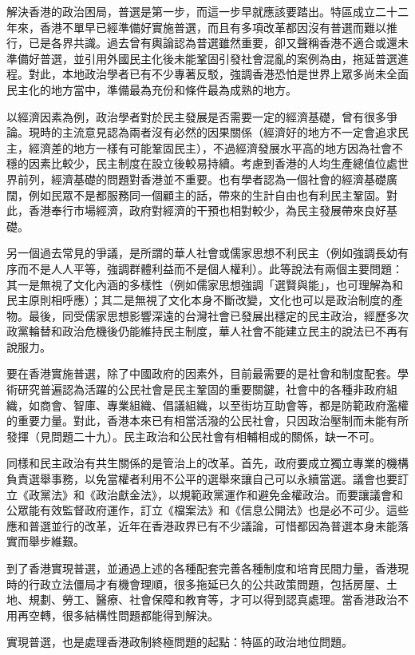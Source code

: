 解決香港的政治困局，普選是第一步，而這一步早就應該要踏出。特區成立二十二年來，香港不單早已經準備好實施普選，而且有多項改革都因沒有普選而難以推行，已是各界共識。過去曾有輿論認為普選雖然重要，卻又聲稱香港不適合或還未準備好普選，並引用外國民主化後未能鞏固引發社會混亂的案例為由，拖延普選進程。對此，本地政治學者已有不少專著反駁，強調香港恐怕是世界上眾多尚未全面民主化的地方當中，準備最為充份和條件最為成熟的地方。

以經濟因素為例，政治學者對於民主發展是否需要一定的經濟基礎，曾有很多爭論。現時的主流意見認為兩者沒有必然的因果關係（經濟好的地方不一定會追求民主，經濟差的地方一樣有可能鞏固民主），不過經濟發展水平高的地方因為社會不穩的因素比較少，民主制度在設立後較易持續。考慮到香港的人均生產總值位處世界前列，經濟基礎的問題對香港並不重要。也有學者認為一個社會的經濟基礎廣闊，例如民眾不是都服務同一個顧主的話，帶來的生計自由也有利民主鞏固。對此，香港奉行市場經濟，政府對經濟的干預也相對較少，為民主發展帶來良好基礎。

另一個過去常見的爭議，是所謂的華人社會或儒家思想不利民主（例如強調長幼有序而不是人人平等，強調群體利益而不是個人權利）。此等說法有兩個主要問題：其一是無視了文化內涵的多樣性（例如儒家思想強調「選賢與能」，也可理解為和民主原則相呼應）；其二是無視了文化本身不斷改變，文化也可以是政治制度的產物。最後，同受儒家思想影響深遠的台灣社會已發展出穩定的民主政治，經歷多次政黨輪替和政治危機後仍能維持民主制度，華人社會不能建立民主的說法已不再有說服力。

要在香港實施普選，除了中國政府的因素外，目前最需要的是社會和制度配套。學術研究普遍認為活躍的公民社會是民主鞏固的重要關鍵，社會中的各種非政府組織，如商會、智庫、專業組織、倡議組織，以至街坊互助會等，都是防範政府濫權的重要力量。對此，香港本來已有相當活潑的公民社會，只因政治壓制而未能有所發揮（見問題二十九）。民主政治和公民社會有相輔相成的關係，缺一不可。

同樣和民主政治有共生關係的是管治上的改革。首先，政府要成立獨立專業的機構負責選舉事務，以免當權者利用不公平的選舉來讓自己可以永續當選。議會也要訂立《政黨法》和《政治獻金法》，以規範政黨運作和避免金權政治。而要讓議會和公眾能有效監督政府運作，訂立《檔案法》和《信息公開法》也是必不可少。這些應和普選並行的改革，近年在香港政界已有不少議論，可惜都因為普選本身未能落實而舉步維艱。

到了香港實現普選，並通過上述的各種配套完善各種制度和培育民間力量，香港現時的行政立法僵局才有機會理順，很多拖延已久的公共政策問題，包括房屋、土地、規劃、勞工、醫療、社會保障和教育等，才可以得到認真處理。當香港政治不用再空轉，很多結構性問題都能得到解決。

實現普選，也是處理香港政制終極問題的起點：特區的政治地位問題。

